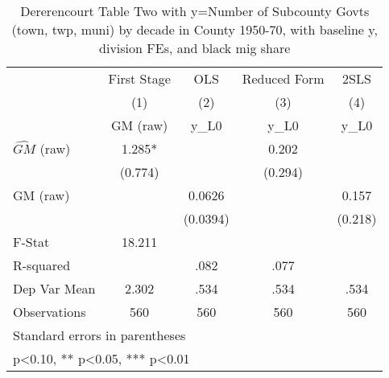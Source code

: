 \begin{table}[htbp]\centering
\def\sym#1{\ifmmode^{#1}\else\(^{#1}\)\fi}
\caption{Dererencourt Table Two with y=Number of Subcounty Govts (town, twp, muni) by decade in County 1950-70, with baseline y, division FEs, and black mig share}
\begin{tabular}{l*{4}{c}}
\toprule
                    & First Stage   &         OLS   &Reduced Form   &        2SLS   \\
                    &\multicolumn{1}{c}{(1)}&\multicolumn{1}{c}{(2)}&\multicolumn{1}{c}{(3)}&\multicolumn{1}{c}{(4)}\\
                    &\multicolumn{1}{c}{GM  (raw)}&\multicolumn{1}{c}{y\_L0}&\multicolumn{1}{c}{y\_L0}&\multicolumn{1}{c}{y\_L0}\\
\midrule
$\hat{GM}$ (raw)    &       1.285*  &               &       0.202   &               \\
                    &     (0.774)   &               &     (0.294)   &               \\
\addlinespace
GM  (raw)           &               &      0.0626   &               &       0.157   \\
                    &               &    (0.0394)   &               &     (0.218)   \\
\midrule
F-Stat              &      18.211   &               &               &               \\
R-squared           &               &        .082   &        .077   &               \\
Dep Var Mean        &       2.302   &        .534   &        .534   &        .534   \\
Observations        &         560   &         560   &         560   &         560   \\
\bottomrule
\multicolumn{5}{l}{\footnotesize Standard errors in parentheses}\\
\multicolumn{5}{l}{\footnotesize * p<0.10, ** p<0.05, *** p<0.01}\\
\end{tabular}
\end{table}
